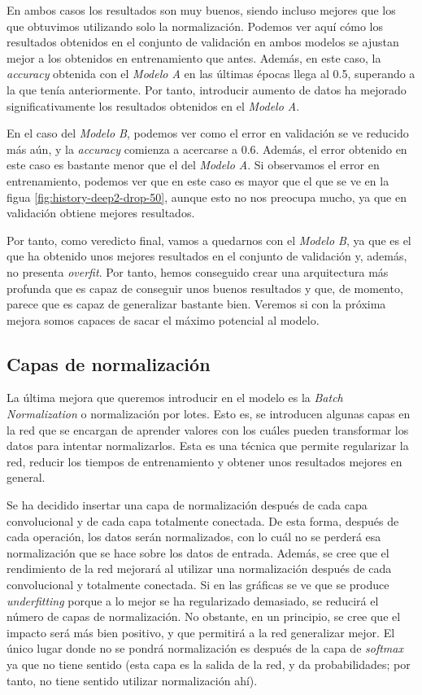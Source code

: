 \documentclass[11pt,a4paper]{article}
\begin{document}
En ambos casos los resultados son muy buenos, siendo incluso mejores que los que obtuvimos
utilizando solo la normalización. Podemos ver aquí cómo los resultados obtenidos en el conjunto
de validación en ambos modelos se ajustan mejor a los obtenidos en entrenamiento que antes. Además,
en este caso, la \textit{accuracy} obtenida con el \textit{Modelo A} en las últimas épocas llega al
0.5, superando a la que tenía anteriormente. Por tanto, introducir aumento de datos ha mejorado
significativamente los resultados obtenidos en el \textit{Modelo A}.

En el caso del \textit{Modelo B}, podemos ver como el error en validación se ve reducido más aún,
y la \textit{accuracy} comienza a acercarse a 0.6. Además, el error obtenido en este caso es bastante
menor que el del \textit{Modelo A}. Si observamos el error en entrenamiento, podemos ver que en este
caso es mayor que el que se ve en la figua \ref{fig:history-deep2-drop-50}, aunque esto no nos preocupa
mucho, ya que en validación obtiene mejores resultados.

Por tanto, como veredicto final, vamos a quedarnos con el \textit{Modelo B}, ya que es el que ha
obtenido unos mejores resultados en el conjunto de validación y, además, no presenta \textit{overfit}.
Por tanto, hemos conseguido crear una arquitectura más profunda que es capaz de conseguir unos buenos
resultados y que, de momento, parece que es capaz de generalizar bastante bien. Veremos si con la
próxima mejora somos capaces de sacar el máximo potencial al modelo.

\subsection{Capas de normalización}

La última mejora que queremos introducir en el modelo es la \textit{Batch Normalization} o normalización
por lotes. Esto es, se introducen algunas capas en la red que se encargan de aprender valores con
los cuáles pueden transformar los datos para intentar normalizarlos. Esta es una técnica que permite
regularizar la red, reducir los tiempos de entrenamiento y obtener unos resultados mejores en general.

Se ha decidido insertar una capa de normalización después de cada capa convolucional y de cada
capa totalmente conectada. De esta forma, después de cada operación, los datos serán normalizados,
con lo cuál no se perderá esa normalización que se hace sobre los datos de entrada. Además, se cree
que el rendimiento de la red mejorará al utilizar una normalización después de cada convolucional y
totalmente conectada. Si en las gráficas se ve que se produce \textit{underfitting} porque a lo mejor
se ha regularizado demasiado, se reducirá el número de capas de normalización. No obstante, en un principio,
se cree que el impacto será más bien positivo, y que permitirá a la red generalizar mejor. El único
lugar donde no se pondrá normalización es después de la capa de \textit{softmax} ya que no tiene sentido
(esta capa es la salida de la red, y da probabilidades; por tanto, no tiene sentido utilizar normalización
ahí).
\end{document}
